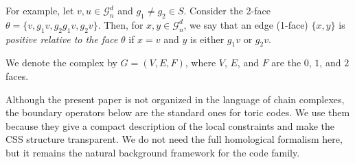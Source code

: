 \begin{example}
  For example, let $v, u \in \mathcal{G}_{n}^{d}$ and $g_{1} \neq g_{2} \in S$. Consider the 2-face $\theta = \{v, g_{1}v, g_{2}g_{1}v, g_{2}v\}$. Then, for $x, y \in \mathcal{G}_{n}^{d}$, we say that an edge (1-face) $\{x, y\}$ is \textit{positive relative to the face} $\theta$ if $x = v$ and $y$ is either $g_{1}v$ or $g_{2}v$.
\end{example}

We denote the complex by $G = (V, E, F)$, where $V$, $E$, and $F$ are the $0$, $1$, and $2$ faces.

Although the present paper is not organized in the language of chain complexes, the boundary operators below are the standard ones for toric codes. We use them because they give a compact description of the local constraints and make the CSS structure transparent. We do not need the full homological formalism here, but it remains the natural background framework for the code family.

